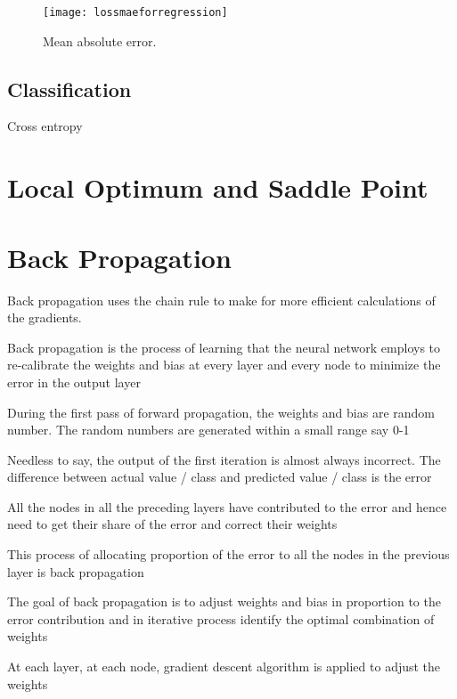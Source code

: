  	\begin{figure}[h]
		\centering
		\texttt{[image: lossmaeforregression]}
		\caption[Mean absolute error]{Mean absolute error.}
		\label{fig:lossmaeforregression}
	\end{figure}

	\subsection{Classification}
Cross entropy


	\section{Local Optimum and Saddle Point}

	\section{Back Propagation}
Back propagation uses the chain rule to make for more efficient calculations of the gradients.

	\begin{bulletedlist}
		\item Back propagation is the process of learning that the neural network employs to re-calibrate the weights and bias at every layer and every node to minimize the error in the output layer
		\item During the first pass of forward propagation, the weights and bias are random number. The random numbers are generated within a small range say 0-1
		\item Needless to say, the output of the first iteration is almost always incorrect. The difference between actual value / class and predicted value / class is the error
		\item All the nodes in all the preceding layers have contributed to the error and hence need to get their share of the error and correct their weights
		\item This process of allocating proportion of the error to all the nodes in the previous layer is back propagation
		\item The goal of back propagation is to adjust weights and bias in proportion to the error contribution and in iterative process identify the optimal combination of weights
		\item At each layer, at each node, gradient descent algorithm is applied to adjust the weights
	\end{bulletedlist}

